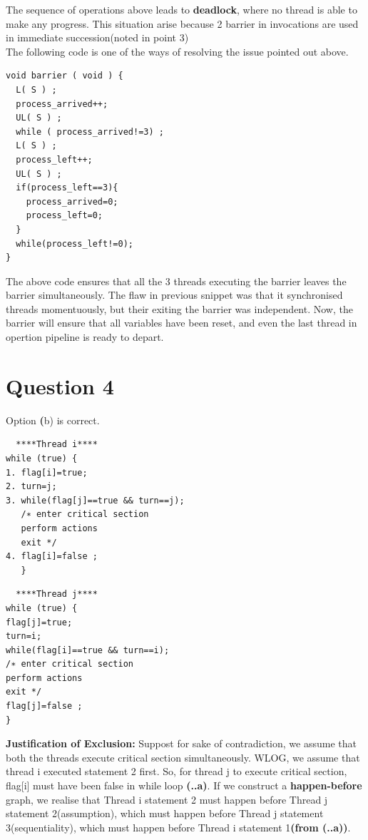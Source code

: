 \documentclass{article}
\newcommand{\bld}[1]{\textbf{#1}}
\begin{document}
The sequence of operations above leads to \bld{deadlock}, where no thread is able to make any progress. This situation arise because 2 barrier in invocations are used in immediate succession(noted in point 3)\\

The following code is one of the ways of resolving the issue pointed out above.

\begin{verbatim}
void barrier ( void ) {
  L( S ) ;
  process_arrived++;
  UL( S ) ;
  while ( process_arrived!=3) ;
  L( S ) ;
  process_left++;
  UL( S ) ;
  if(process_left==3){
    process_arrived=0;
    process_left=0;
  }
  while(process_left!=0);
}
\end{verbatim}

The above code ensures that all the 3 threads executing the barrier leaves the barrier simultaneously. The flaw in previous snippet was that it synchronised threads momentuously, but their exiting the barrier was independent. Now, the barrier will ensure that all variables have been reset, and even the last thread in opertion pipeline is ready to depart.


\section*{Question 4}

Option \bld(b) is correct.\\

\begin{minipage}{0.5\textwidth}
 \begin{lstlisting}
  ****Thread i****
while (true) {
1. flag[i]=true;
2. turn=j;
3. while(flag[j]==true && turn==j);
   /∗ enter critical section
   perform actions
   exit */
4. flag[i]=false ;
   } 
\end{lstlisting}
\end{minipage}
\begin{minipage}{0.5\textwidth}
 \begin{lstlisting}
  ****Thread j****
while (true) {
flag[j]=true;
turn=i;
while(flag[i]==true && turn==i);
/∗ enter critical section
perform actions
exit */
flag[j]=false ;
} 
\end{lstlisting}\end{minipage}


\bld{Justification of Exclusion:} Suppost for sake of contradiction, we assume that both the threads execute critical section simultaneously. WLOG, we assume that thread i executed statement 2 first. So, for thread j to execute critical section, flag[i] must have been false in while loop \bld{(..a)}. If we construct a \bld{happen-before} graph, we realise that Thread i statement 2 must happen before Thread j statement 2(assumption), which must happen before Thread j statement 3(sequentiality), which must happen before Thread i statement 1\bld{(from (..a))}. 
\end{document}
